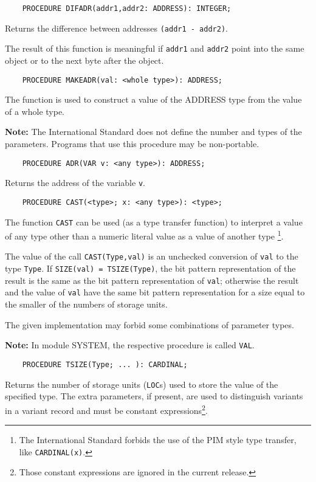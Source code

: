 \verb'    PROCEDURE DIFADR(addr1,addr2: ADDRESS): INTEGER;'

Returns the difference between addresses {\tt (addr1 - addr2)}.

\ifgenc
The result of this function is meaningful if
\verb|addr1| and \verb|addr2| point into the same
object or to the next byte after the object.
\fi

\verb'    PROCEDURE MAKEADR(val: <whole type>): ADDRESS;'

The function is used to construct a value of the ADDRESS type
from the value of a whole type.

{\bf Note:} The International Standard
does not define the number and types of the parameters.
Programs that use this procedure may be non-portable.

\verb'    PROCEDURE ADR(VAR v: <any type>): ADDRESS;'

Returns the address of the variable {\tt v}.

\verb'    PROCEDURE CAST(<type>; x: <any type>): <type>;'

The function {\tt CAST} can be used (as a type transfer function)
to interpret a value of any type other than a numeric literal
value as a value of another type
\footnote{The International Standard forbids the use of
the PIM style type transfer, like {\tt CARDINAL(x)}.}.

The  value  of  the  call  {\tt  CAST(Type,val)}  is an unchecked
conversion of {\tt val} to the type {\tt Type}.
If {\tt SIZE(val) = TSIZE(Type)},
the  bit pattern representation of the result is
the  same  as  the  bit  pattern  representation  of  {\tt  val};
otherwise the result and the value of {\tt val} have the same bit
pattern  representation  for  a  size equal to the smaller of the
numbers of storage units.

The given implementation may forbid some combinations  of
parameter types.

{\bf Note:} In \ot{} module SYSTEM, the respective procedure
is called \verb'VAL'.

\verb'    PROCEDURE TSIZE(Type; ... ): CARDINAL;'

Returns the number of storage units (\verb'LOC's) used to
store the value of the specified type. The extra parameters,
if present, are used to distinguish variants in a variant
record and must be constant expressions\footnote{Those constant
expressions are ignored in the current release.}.


